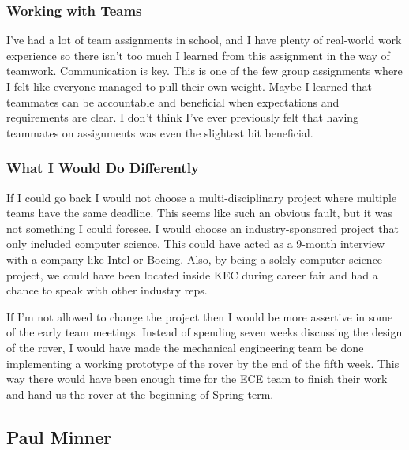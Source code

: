 \documentclass[10pt,letterpaper,onecolumn,draftclsnofoot,journal]{IEEEtran}
\begin{document}
\subsubsection{\textbf{Working with Teams}}
I've had a lot of team assignments in school, and I have plenty of real-world work experience so there isn't too much I learned from this assignment in the way of teamwork. Communication is key. This is one of the few group assignments where I felt like everyone managed to pull their own weight. Maybe I learned that teammates can be accountable and beneficial when expectations and requirements are clear. I don't think I've ever previously felt that having teammates on assignments was even the slightest bit beneficial.
\subsubsection{\textbf{What I Would Do Differently}}
If I could go back I would not choose a multi-disciplinary project where multiple teams have the same deadline. This seems like such an obvious fault, but it was not something I could foresee. I would choose an industry-sponsored project that only included computer science. This could have acted as a 9-month interview with a company like Intel or Boeing. Also, by being a solely computer science project, we could have been located inside KEC during career fair and had a chance to speak with other industry reps.\vspace{.3cm}
\par 
If I'm not allowed to change the project then I would be more assertive in some of the early team meetings. Instead of spending seven weeks discussing the design of the rover, I would have made the mechanical engineering team be done implementing a working prototype of the rover by the end of the fifth week. This way there would have been enough time for the ECE team to finish their work and hand us the rover at the beginning of Spring term. 

\subsection{\textbf{Paul Minner}}
\end{document}
